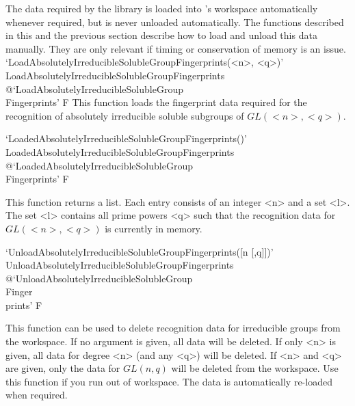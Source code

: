 The data required by the {\IRREDSOL} library is loaded into {\GAP}'s workspace automatically whenever required, but is never unloaded automatically. The functions described in this
and the previous section describe how to load and unload this data manually. 
They are only relevant if timing or conservation of memory is an issue.
\>`LoadAbsolutelyIrreducibleSolubleGroupFingerprints(<n>, <q>)'%
{LoadAbsolutelyIrreducibleSolubleGroupFingerprints}%
@{`LoadAbsolutelyIrreducibleSolubleGroup\\Fingerprints'} F
This function loads the fingerprint data required for the recognition
of absolutely irreducible soluble subgroups of $GL(<n>, <q>)$.

\>`LoadedAbsolutelyIrreducibleSolubleGroupFingerprints()'%
{LoadedAbsolutelyIrreducibleSolubleGroupFingerprints}%
@{`LoadedAbsolutelyIrreducibleSolubleGroup\\Fingerprints'} F

This function returns a list. Each entry consists of an integer <n> and a set <l>. The set
<l> contains all prime powers <q> such that the recognition data for $GL(<n>, <q>)$ is currently in
memory.

\>`UnloadAbsolutelyIrreducibleSolubleGroupFingerprints([n [,q]])'%
{UnloadAbsolutelyIrreducibleSolubleGroupFingerprints}%
@{`UnloadAbsolutelyIrreducibleSolubleGroup\\Finger\\prints'} F

This function can be used to delete recognition data for irreducible groups from the {\GAP} workspace. If no
argument is given, all data will be deleted. If only <n> is given, all data for degree <n> (and any
<q>) will be deleted. If <n> and <q> are given, only the data for $GL(n, q)$ will be deleted from the
{\GAP} workspace. Use this function if you run out of {\GAP} workspace. The
data is automatically re-loaded when required.



